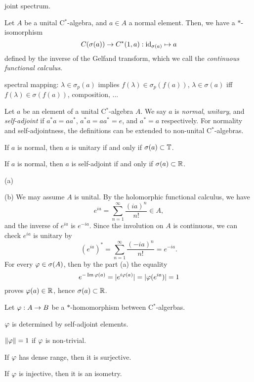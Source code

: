 \documentclass{../../large}
\begin{document}
\begin{prb}
joint spectrum.
\end{prb}


\begin{prb}
Let $A$ be a unital C$^*$-algebra, and $a\in A$ a normal element.
Then, we have a $*$-isomorphism
\[C(\sigma(a))\to C^*(1,a):\operatorname{id}_{\sigma(a)}\mapsto a\]
defined by the inverse of the Gelfand transform, which we call the \emph{continuous functional calculus}.

\begin{parts}
\item spectral mapping: $\lambda\in\sigma_p(a)$ implies $f(\lambda)\in\sigma_p(f(a))$, $\lambda\in\sigma(a)$ iff $f(\lambda)\in\sigma(f(a))$, composition, ...
\end{parts}
\end{prb}




\begin{prb}
Let $a$ be an element of a unital C$^*$-algebra $A$.
We say $a$ is \emph{normal}, \emph{unitary}, and \emph{self-adjoint} if $a^*a=aa^*$, $a^*a=aa^*=e$, and $a^*=a$ respectively.
For normality and self-adjointness, the definitions can be extended to non-unital C$^*$-algebras.
\begin{parts}
\item If $a$ is normal, then $a$ is unitary if and only if $\sigma(a)\subset\mathbb{T}$.
\item If $a$ is normal, then $a$ is self-adjoint if and only if $\sigma(a)\subset\mathbb{R}$.
\end{parts}
\end{prb}
\begin{pf}
(a)

(b)
We may assume $A$ is unital.
By the holomorphic functional calculus, we have
\[e^{ia}=\sum_{n=1}^\infty\frac{(ia)^n}{n!}\in A,\]
and the inverse of $e^{ia}$ is $e^{-ia}$.
Since the involution on $A$ is continuous, we can check $e^{ia}$ is unitary by
\[(e^{ia})^*=\sum_{n=1}^\infty\frac{(-ia)^n}{n!}=e^{-ia}.\]
For every $\varphi\in\sigma(A)$, then by the part (a) the equality
\[e^{-\operatorname{Im}\varphi(a)}=|e^{i\varphi(a)}|=|\varphi(e^{ia})|=1\]
proves $\varphi(a)\in\mathbb{R}$, hence $\sigma(a)\subset\mathbb{R}$.
\end{pf}

\begin{prb}[$*$-homomorphism]
Let $\varphi:A\to B$ be a $*$-homomorphism between C$^*$-algerbas.
\begin{parts}
\item $\varphi$ is determined by self-adjoint elements.
\item $\|\varphi\|=1$ if $\varphi$ is non-trivial.
\item If $\varphi$ has dense range, then it is surjective.
\item If $\varphi$ is injective, then it is an isometry.
\end{parts}
\end{prb}
\end{document}
